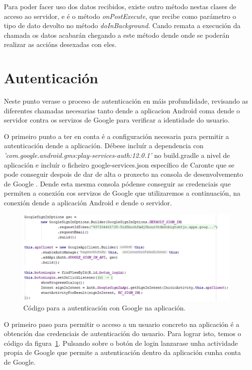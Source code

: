 Para poder facer uso dos datos recibidos, existe outro método nestas clases de acceso ao servidor, e é o método \emph{onPostExecute}, que recibe como parámetro o tipo de dato devolto no método \emph{doInBackground}. Cando remata a execución da chamada os datos acabarán chegando a este método dende onde se poderán realizar as accións desexadas con eles.


\section{Autenticación}
Neste punto verase o proceso de autenticación en máis profundidade, revisando as diferentes chamadas necesarias tanto dende a aplicacion Android coma dende o servidor contra os servizos de Google para verificar a identidade do usuario.

O primeiro punto a ter en conta é a configuración necesaria para permitir a autenticación dende a aplicación. Débese incluír a dependencia con \emph{'com.google.android.gms:play-services-auth:12.0.1'} no build.gradle a nivel de aplicación e incluír o ficheiro google-services.json específico de Caronte que se pode conseguir despois de dar de alta o proxecto na consola de desenvolvemento de Google \cite{consolaDesenvolvedorGoogle}. Dende esta mesma consola pódense conseguir as credenciais que permiten a conexión cos servizos de Google que utilizaremos a continuación, na conexión dende a aplicación Android e dende o servidor.


\begin{figure}[htb] 
	\begin{center}
		\includegraphics[width=1\textwidth]{figures/codigo/autenticacionGoogleInicio}
		\caption{Código para a autenticación con Google na aplicación.}
		\label{fig:autenticacionGoogleInicio}
	\end{center}
\end{figure}

O primeiro paso para permitir o acceso a un usuario concreto na aplicación é a obtención das credenciais de autenticación do usuario. Para lograr isto, temos o código da figura~\ref{fig:autenticacionGoogleInicio}. Pulsando sobre o botón de login lanzarase unha actividade propia de Google que permite a autenticación dentro da aplicación cunha conta de Google.

